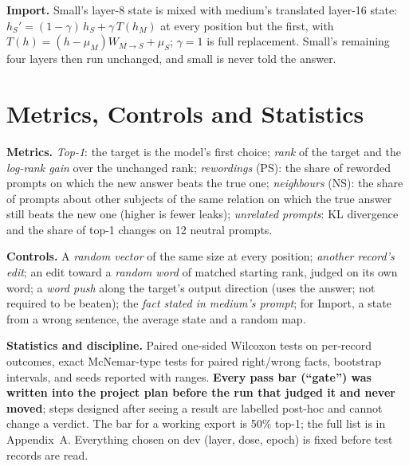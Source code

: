 \textbf{Import.} Small's layer-8 state is mixed with medium's translated layer-16 state: $h_S'=(1-\gamma)\,h_S+\gamma\,T(h_M)$ at every position but the first, with $T(h)=(h-\mu_M)W_{M\to S}+\mu_S$; $\gamma=1$ is full replacement. Small's remaining four layers then run unchanged, and small is never told the answer.

\section{Metrics, Controls and Statistics}

\textbf{Metrics.} \emph{Top-1}: the target is the model's first choice; \emph{rank} of the target and the \emph{log-rank gain} over the unchanged rank; \emph{rewordings} (PS): the share of reworded prompts on which the new answer beats the true one; \emph{neighbours} (NS): the share of prompts about other subjects of the same relation on which the true answer still beats the new one (higher is fewer leaks); \emph{unrelated prompts}: KL divergence and the share of top-1 changes on 12 neutral prompts.

\textbf{Controls.} A \emph{random vector} of the same size at every position; \emph{another record's edit}; an edit toward a \emph{random word} of matched starting rank, judged on its own word; a \emph{word push} along the target's output direction (uses the answer; not required to be beaten); the \emph{fact stated in medium's prompt}; for Import, a state from a wrong sentence, the average state and a random map.

\textbf{Statistics and discipline.} Paired one-sided Wilcoxon tests \cite{r40} on per-record outcomes, exact McNemar-type tests \cite{r39} for paired right/wrong facts, bootstrap intervals, and seeds reported with ranges. \textbf{Every pass bar (``gate'') was written into the project plan before the run that judged it and never moved}; steps designed after seeing a result are labelled post-hoc and cannot change a verdict. The bar for a working export is 50\% top-1; the full list is in Appendix~A. Everything chosen on dev (layer, dose, epoch) is fixed before test records are read.
